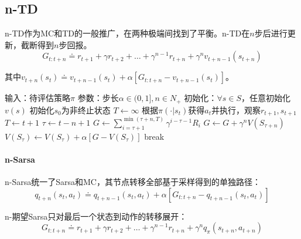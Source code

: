\documentclass[
12pt, %
a4paper, 
oneside, %
headinclude,footinclude, %
]{scrartcl}
\begin{document}
\subsection[n-TD]{n-TD}
n-TD作为MC和TD的一般推广，在两种极端间找到了平衡。n-TD在$ n $步后进行更新，截断得到$ n $步回报。
$$ G_{t:t + n} \doteq r_{t + 1} + \gamma r_{t + 2} + \dots + \gamma^{n - 1} r_{t + n} + \gamma^n v_{t + n - 1}(s_{t + n}) $$

其中$ v_{t + n}(s_t) \doteq v_{t + n - 1}(s_t) + \alpha[G_{t:t + n} - v_{t + n - 1}(s_t)] $。
\begin{myalgorithm}[n-TD]
\State 输入：待评估策略$ \pi $
\State 参数：步长$ \alpha \in (0,1], n \in N_+ $
\State 初始化：$ \forall s \in S $，任意初始化$ v(s) $
\State 初始化$ s_0 $为非终止状态
\State $ T \gets \infty $
\State 根据$ \pi(\cdot|s_t) $获得$ a_t $并执行，观察$ r_{t + 1}, s_{t + 1} $
\State $ T \gets t + 1 $
\EndIf
\EndIf
\State $ \tau \gets t - n + 1 $ 
\State $ G \gets \sum_{i = \tau + 1}^{\min(\tau + n,T)} \gamma^{i - \tau - 1}R_i $
\State $ G \gets G + \gamma^n V(S_{\tau + n}) $
\EndIf
\State $ V(S_{\tau}) \gets V(S_{\tau}) + \alpha[G - V(S_{\tau})] $
\EndIf
{}
\State break
\EndIf
\EndFor
\EndFor
\end{myalgorithm}

\paragraph{n-Sarsa}
n-Sarsa统一了Sarsa和MC，其节点转移全部基于采样得到的单独路径：
$$ q_{t + n}(s_t, a_t) \doteq q_{t + n - 1}(s_t, a_t) + \alpha [G_{t:t + n} - q_{t + n - 1}(s_t, a_t)] $$

n-期望Sarsa只对最后一个状态到动作的转移展开：
$$ G_{t:t + n} \doteq r_{t + 1} + \gamma r_{t + 2} + \dots + \gamma^{n - 1} r_{t + n} + \gamma^n q_{\pi}(s_{t + n}, a_{t + n}) $$
\end{document}
